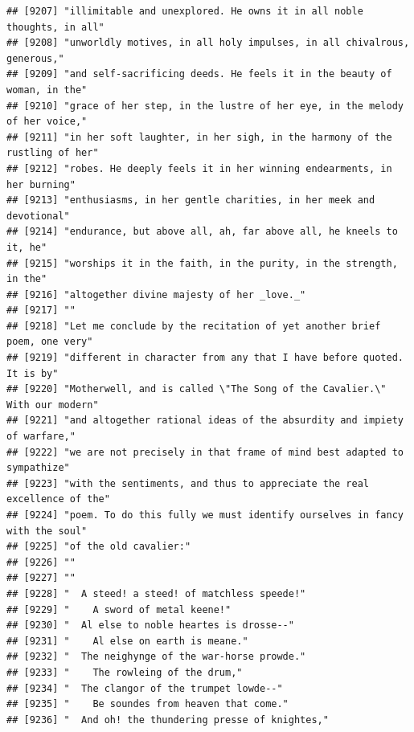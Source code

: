 \documentclass{article}\usepackage[]{graphicx}\usepackage[]{color}
\makeatletter
\newenvironment{kframe}{%
 \def\at@end@of@kframe{}%
 \ifinner\ifhmode%
  \def\at@end@of@kframe{\end{minipage}}%
  \begin{minipage}{\columnwidth}%
 \fi\fi%
 \def\FrameCommand##1{\hskip\@totalleftmargin \hskip-\fboxsep
 \colorbox{shadecolor}{##1}\hskip-\fboxsep
     \hskip-\linewidth \hskip-\@totalleftmargin \hskip\columnwidth}%
 \MakeFramed {\advance\hsize-\width
   \@totalleftmargin\z@ \linewidth\hsize
   \@setminipage}}%
 {\par\unskip\endMakeFramed%
 \at@end@of@kframe}
\newenvironment{knitrout}{}{} %
\makeatother
\begin{document}
\begin{knitrout}
\begin{kframe}
\begin{verbatim}
## [9207] "illimitable and unexplored. He owns it in all noble thoughts, in all"        
## [9208] "unworldly motives, in all holy impulses, in all chivalrous, generous,"       
## [9209] "and self-sacrificing deeds. He feels it in the beauty of woman, in the"      
## [9210] "grace of her step, in the lustre of her eye, in the melody of her voice,"    
## [9211] "in her soft laughter, in her sigh, in the harmony of the rustling of her"    
## [9212] "robes. He deeply feels it in her winning endearments, in her burning"        
## [9213] "enthusiasms, in her gentle charities, in her meek and devotional"            
## [9214] "endurance, but above all, ah, far above all, he kneels to it, he"            
## [9215] "worships it in the faith, in the purity, in the strength, in the"            
## [9216] "altogether divine majesty of her _love._"                                    
## [9217] ""                                                                            
## [9218] "Let me conclude by the recitation of yet another brief poem, one very"       
## [9219] "different in character from any that I have before quoted. It is by"         
## [9220] "Motherwell, and is called \"The Song of the Cavalier.\" With our modern"     
## [9221] "and altogether rational ideas of the absurdity and impiety of warfare,"      
## [9222] "we are not precisely in that frame of mind best adapted to sympathize"       
## [9223] "with the sentiments, and thus to appreciate the real excellence of the"      
## [9224] "poem. To do this fully we must identify ourselves in fancy with the soul"    
## [9225] "of the old cavalier:"                                                        
## [9226] ""                                                                            
## [9227] ""                                                                            
## [9228] "  A steed! a steed! of matchless speede!"                                    
## [9229] "    A sword of metal keene!"                                                 
## [9230] "  Al else to noble heartes is drosse--"                                      
## [9231] "    Al else on earth is meane."                                              
## [9232] "  The neighynge of the war-horse prowde."                                    
## [9233] "    The rowleing of the drum,"                                               
## [9234] "  The clangor of the trumpet lowde--"                                        
## [9235] "    Be soundes from heaven that come."                                       
## [9236] "  And oh! the thundering presse of knightes,"                                

\end{verbatim}
\end{kframe}
\end{knitrout}
\end{document}

